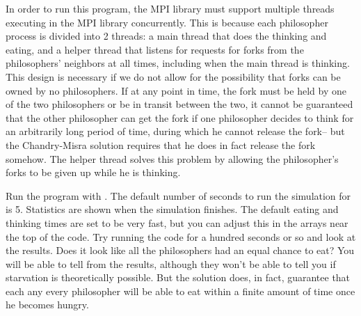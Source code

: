 \documentclass[letterpaper,10pt,openany,oneside]{sphinxmanual}
\begin{document}
In order to run this program, the MPI library must support multiple
threads executing in the MPI library concurrently. This is because
each philosopher process is divided into 2 threads: a main thread
that does the thinking and eating, and a helper thread that listens
for requests for forks from the philosophers' neighbors at all
times, including when the main thread is thinking. This design is
necessary if we do not allow for the possibility that forks can be
owned by no philosophers. If at any point in time, the fork must be
held by one of the two philosophers or be in transit between the
two, it cannot be guaranteed that the other philosopher can get the
fork if one philosopher decides to think for an arbitrarily long
period of time, during which he cannot release the fork-- but the
Chandry-Misra solution requires that he does in fact release the
fork somehow. The helper thread solves this problem by allowing the
philosopher's forks to be given up while he is thinking.

Run the program with . The
default number of seconds to run the simulation for is 5.
Statistics are shown when the simulation finishes. The default
eating and thinking times are set to be very fast, but you can
adjust this in the arrays near the top of the code. Try running the
code for a hundred seconds or so and look at the results. Does it
look like all the philosophers had an equal chance to eat? You will
be able to tell from the results, although they won't be able to
tell you if starvation is theoretically possible. But the solution
does, in fact, guarantee that each any every philosopher will be
able to eat within a finite amount of time once he becomes hungry.



\renewcommand{\indexname}{Index}
\printindex
\end{document}
